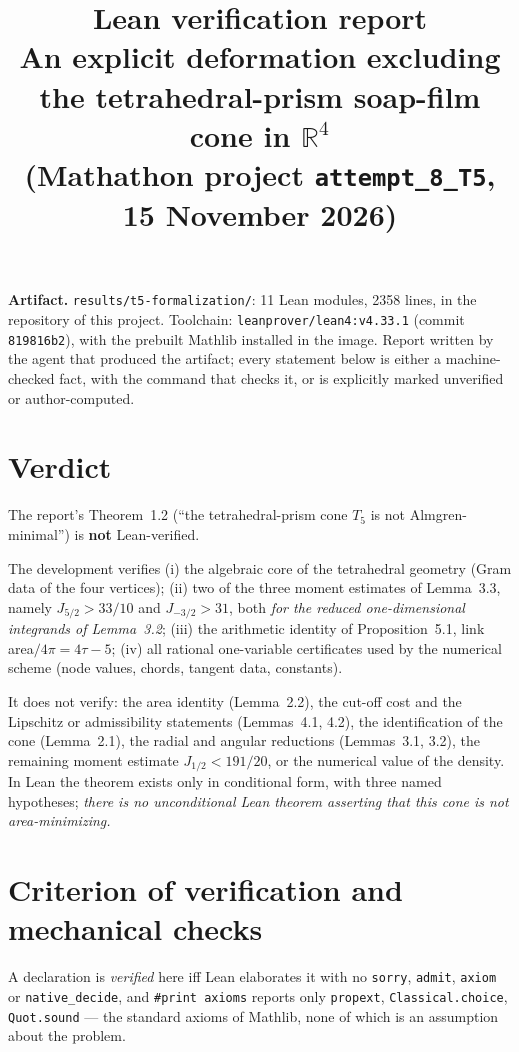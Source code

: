 \documentclass[11pt]{article}
\title{\textbf{Lean verification report}\\[2pt]
\large An explicit deformation excluding the tetrahedral-prism soap-film cone in $\mathbb{R}^4$\\
\large (Mathathon project \texttt{attempt\_\allowbreak{}8\_\allowbreak{}T5}, 15 November 2026)}
\date{}
\newcommand{\Ln}[1]{\texttt{#1}}
\begin{document}
\maketitle

\noindent\textbf{Artifact.} \Ln{results/t5-formalization/}: 11 Lean modules, 2358 lines, in the
repository of this project. Toolchain: \Ln{leanprover/lean4:v4.33.1} (commit
\Ln{819816b2}), with the prebuilt Mathlib installed in the image. Report written by the agent
that produced the artifact; every statement below is either a machine-checked fact, with the
command that checks it, or is explicitly marked unverified or author-computed.

\section{Verdict}
\label{sec:verdict}

The report's Theorem~1.2 (``the tetrahedral-prism cone $T_5$ is not Almgren-minimal'') is
\textbf{not} Lean-verified.

The development verifies (i) the algebraic core of the tetrahedral geometry (Gram data of the
four vertices); (ii) two of the three moment estimates of Lemma~3.3, namely
$J_{5/2}>33/10$ and $J_{-3/2}>31$, both \emph{for the reduced one-dimensional integrands of
Lemma~3.2}; (iii) the arithmetic identity of Proposition~5.1, link area$/4\pi=4\tau-5$;
(iv) all rational one-variable certificates used by the numerical scheme (node values, chords,
tangent data, constants).

It does not verify: the area identity (Lemma~2.2), the cut-off cost and the Lipschitz or
admissibility statements (Lemmas~4.1, 4.2), the identification of the cone (Lemma~2.1), the
radial and angular reductions (Lemmas~3.1, 3.2), the remaining moment estimate
$J_{1/2}<191/20$, or the numerical value of the density. In Lean the theorem exists only in
conditional form, with three named hypotheses; \emph{there is no unconditional Lean theorem
asserting that this cone is not area-minimizing.}

\section{Criterion of verification and mechanical checks}
\label{sec:criterion}

A declaration is \emph{verified} here iff Lean elaborates it with no \Ln{sorry}, \Ln{admit},
\Ln{axiom} or \Ln{native\_\allowbreak{}decide}, and \Ln{\#print axioms} reports only \Ln{propext},
\Ln{Classical.choice}, \Ln{Quot.sound} --- the standard axioms of Mathlib, none of which is an
assumption about the problem.
\end{document}
